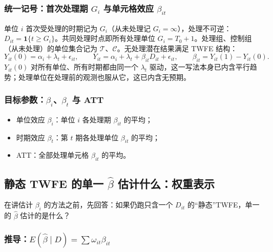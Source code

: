 \subsubsection{统一记号：首次处理期 \texorpdfstring{$G_i$}{G\_i} 与单元格效应 \texorpdfstring{$\beta_{it}$}{beta\_it}}

单位 $i$ 首次受处理的时期记为 $G_i$（从未处理记 $G_i=\infty$），处理不可逆：$D_{it}=\mathbf{1}\{t\ge G_i\}$。共同处理时点即所有处理单位 $G_i=T_0+1$。处理组、控制组（从未处理）的单位集合记为 $\mathcal T$、$\mathcal C$。无处理潜在结果满足 TWFE 结构：
\begin{equation}\label{eq:U17b-het}
Y_{it}(0)=\alpha_i+\lambda_t+\epsilon_{it},\qquad Y_{it}=\alpha_i+\lambda_t+\beta_{it}D_{it}+\epsilon_{it},\qquad \beta_{it}=Y_{it}(1)-Y_{it}(0).
\end{equation}
$Y_{it}(0)$ 对所有单位、所有时期都由同一个 $\lambda_t$ 驱动，这一写法本身已内含平行趋势；处理单位在处理前的观测也服从它，这已内含无预期。

\subsubsection{目标参数：\texorpdfstring{$\beta_i$}{beta\_i}、\texorpdfstring{$\beta_t$}{beta\_t} 与 ATT}

\begin{itemize}
  \item 单位效应 $\beta_i$：单位 $i$ 各处理期 $\beta_{it}$ 的平均；
  \item 时期效应 $\beta_t$：第 $t$ 期各处理单位 $\beta_{it}$ 的平均；
  \item ATT：全部处理单元格 $\beta_{it}$ 的平均。
\end{itemize}

\subsection{静态 TWFE 的单一 \texorpdfstring{$\hat\beta$}{beta hat} 估计什么：权重表示}\label{sec:U17b-weights}

在讲估计 $\beta_i$ 的方法之前，先回答：如果仍跑只含一个 $D_{it}$ 的“静态”TWFE，单一的 $\hat\beta$ 估计的是什么？

\subsubsection{推导：\texorpdfstring{$E(\hat\beta\mid D)=\sum\omega_{it}\beta_{it}$}{E(beta hat | D) = sum of omega\_it beta\_it}}

